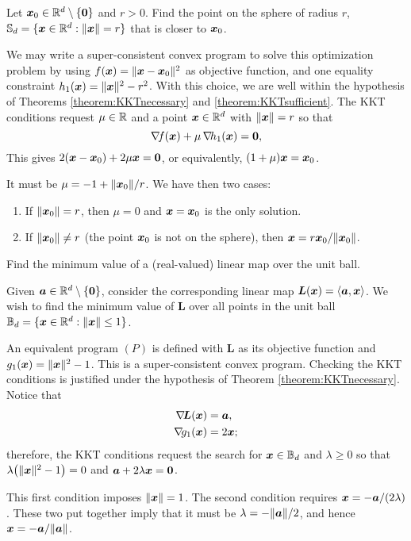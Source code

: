 \begin{example}
Let $\boldsymbol{x}_0 \in \mathbb{R}^d\setminus\{\boldsymbol{0}\}$ and $r>0$.  Find the point on the sphere of radius $r$, $\mathbb{S}_d=\{ \boldsymbol{x} \in \mathbb{R}^d: \lVert \boldsymbol{x} \rVert=r \}$ that is closer to $\boldsymbol{x}_0$. 

We may write a super-consistent convex program to solve this optimization problem by using $f(\boldsymbol{x})=\lVert \boldsymbol{x}-\boldsymbol{x}_0 \rVert^2$ as objective function, and one equality constraint $h_1(\boldsymbol{x})=\lVert \boldsymbol{x} \rVert^2-r^2$.  With this choice, we are well within the hypothesis of Theorems \ref{theorem:KKTnecessary} and \ref{theorem:KKTsufficient}.  The KKT conditions request $\mu \in \mathbb{R}$ and a point $\boldsymbol{x} \in \mathbb{R}^d$ with $\lVert \boldsymbol{x} \rVert = r$ so that
\begin{equation*} 
\mathop{\nabla\! {f}}(\boldsymbol{x}) + \mu\mathop{\nabla\! {h_1}}(\boldsymbol{x}) = \boldsymbol{0},
\end{equation*}
This gives $2(\boldsymbol{x}-\boldsymbol{x}_0)+2\mu\boldsymbol{x} = \boldsymbol{0}$, or equivalently, $(1+\mu)\boldsymbol{x} = \boldsymbol{x}_0$.

It must be $\mu = -1+\lVert \boldsymbol{x}_0 \rVert/r$.  We have then two cases:
\begin{enumerate}
	\item If $\lVert \boldsymbol{x}_0 \rVert=r$, then $\mu=0$ and $\boldsymbol{x}=\boldsymbol{x}_0$ is the only solution.
	\item If $\lVert \boldsymbol{x}_0 \rVert \neq r$ (the point $\boldsymbol{x}_0$ is not on the sphere), then $\boldsymbol{x} = r\boldsymbol{x}_0/\lVert \boldsymbol{x}_0 \rVert$.
\end{enumerate}
\end{example}

\begin{example}
Find the minimum value of a (real-valued) linear map over the unit ball.

Given $\boldsymbol{a} \in \mathbb{R}^d\setminus\{ \boldsymbol{0}\}$, consider the corresponding linear map $\boldsymbol{L}(\boldsymbol{x}) = \langle \boldsymbol{a}, \boldsymbol{x} \rangle$.  We wish to find the minimum value of $\boldsymbol{L}$ over all points in the unit ball $\mathbb{B}_d = \{ \boldsymbol{x} \in \mathbb{R}^d : \lVert \boldsymbol{x} \rVert \leq 1 \}$.

An equivalent program $(P)$ is defined with $\boldsymbol{L}$ as its objective function and $g_1(\boldsymbol{x}) = \lVert \boldsymbol{x} \rVert^2-1$. This is a super-consistent convex program.  Checking the KKT conditions is justified under the hypothesis of Theorem \ref{theorem:KKTnecessary}. Notice that
\begin{align*}
\mathop{\nabla\! {\boldsymbol{L}}}(\boldsymbol{x}) &= \boldsymbol{a}, \\
\mathop{\nabla\! {g_1}}(\boldsymbol{x}) &= 2\boldsymbol{x};
\end{align*}
therefore, the KKT conditions request the search for $\boldsymbol{x} \in \mathbb{B}_d$ and $\lambda \geq 0$ so that $\lambda \big( \lVert \boldsymbol{x} \rVert^2-1 \big)=0$ and $\boldsymbol{a}+2\lambda\boldsymbol{x}=\boldsymbol{0}$.

This first condition imposes $\lVert \boldsymbol{x} \rVert=1$.  The second condition requires $\boldsymbol{x} = -\boldsymbol{a}/(2\lambda)$.  These two put together imply that it must be $\lambda = -\lVert \boldsymbol{a} \rVert/2$, and hence $\boldsymbol{x} = -\boldsymbol{a}/\lVert \boldsymbol{a} \rVert$.
\end{example}